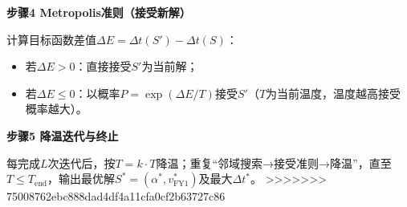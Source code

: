 \documentclass[../main.tex]{subfiles}
\begin{document}
\noindent\textbf{步骤4  Metropolis准则（接受新解）}

计算目标函数差值$\Delta E = \Delta t(S') - \Delta t(S)$：
\begin{itemize}
    \item 若$\Delta E > 0$：直接接受$S'$为当前解；
    \item 若$\Delta E \leq 0$：以概率$P = \exp(\Delta E/T)$接受$S'$（$T$为当前温度，温度越高接受概率越大）。
\end{itemize}

\noindent\textbf{步骤5 降温迭代与终止}

每完成$L$次迭代后，按$T = k \cdot T$降温；重复“邻域搜索→接受准则→降温”，直至$T \leq T_{\text{end}}$，输出最优解$S^*=(\alpha^*, v_{\text{FY1}}^*)$及最大$\Delta t^*$。
>>>>>>> 75008762ebc888dad4df4a11cfa0cf2b63727c86
\end{document}
